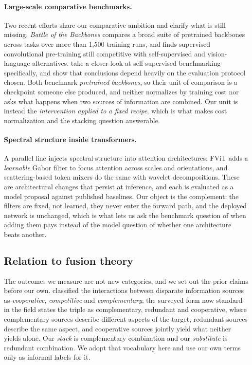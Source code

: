 \paragraph{Large-scale comparative benchmarks.} Two recent efforts share our
comparative ambition and clarify what is still missing. \emph{Battle of the
Backbones} \citep{goldblum2023battle} compares a broad suite of pretrained
backbones across tasks over more than 1{,}500 training runs, and finds
supervised convolutional pre-training still competitive with self-supervised
and vision-language alternatives. \citet{marks2025closer} take a closer look at
self-supervised benchmarking specifically, and show that conclusions depend
heavily on the evaluation protocol chosen. Both benchmark \emph{pretrained
backbones}, so their unit of comparison is a checkpoint someone else produced,
and neither normalizes by training cost nor asks what happens when two sources
of information are combined. Our unit is instead the \emph{intervention applied
to a fixed recipe}, which is what makes cost normalization and the stacking
question answerable.

\paragraph{Spectral structure inside transformers.} A parallel line injects
spectral structure into attention architectures: FViT \citep{shi2026fvit} adds
a \emph{learnable} Gabor filter to focus attention across scales and
orientations, and scattering-based token mixers do the same with wavelet
decompositions. These are architectural changes that persist at inference, and
each is evaluated as a model proposal against published baselines. Our object
is the complement: the filters are fixed, not learned, they never enter
the forward path, and the deployed network is unchanged, which is what lets us
ask the benchmark question of when adding them pays instead of the model
question of whether one architecture beats another.


\subsection{Relation to fusion theory}\label{sec:fusiontheory}
The outcomes we measure are not new categories, and we set out the prior claims
before our own. \citet{durrantwhyte1988sensor} classified the interactions
between disparate information sources as \emph{cooperative}, \emph{competitive}
and \emph{complementary}; the surveyed form now standard in the field
\citep{khaleghi2013multisensor} states the triple as complementary, redundant
and cooperative, where complementary sources describe different aspects of the
target, redundant sources describe the same aspect, and cooperative sources
jointly yield what neither yields alone. Our \emph{stack} is complementary
combination and our \emph{substitute} is redundant combination. We adopt that
vocabulary here and use our own terms only as informal labels for it.


